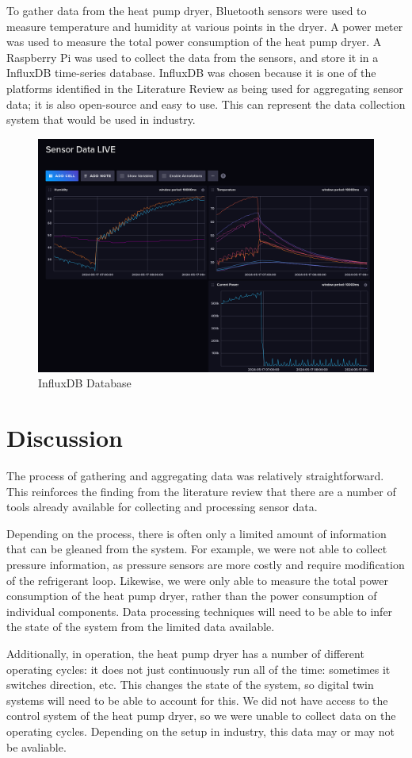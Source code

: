 To gather data from the heat pump dryer, Bluetooth sensors were used to measure temperature and humidity at various points in the dryer. 
A power meter was used to measure the total power consumption of the heat pump dryer. 
A Raspberry Pi was used to collect the data from the sensors, and store it in a InfluxDB time-series database. 
InfluxDB was chosen because it is one of the platforms identified in the Literature Review as being used for aggregating sensor data; it is also open-source and easy to use. 
This can represent the data collection system that would be used in industry.


\begin{figure}
    \centering
    \includegraphics[width=\textwidth]{influxdb.png}
    \caption{InfluxDB Database}
    \label{fig:influxdb}
\end{figure}

\section{Discussion}

The process of gathering and aggregating data was relatively straightforward. 
This reinforces the finding from the literature review that there are a number of tools already available for collecting and processing sensor data. 

Depending on the process, there is often only a limited amount of information that can be gleaned from the system. 
For example, we were not able to collect pressure information, as pressure sensors are more costly and require modification of the refrigerant loop. 
Likewise, we were only able to measure the total power consumption of the heat pump dryer, rather than the power consumption of individual components. 
Data processing techniques will need to be able to infer the state of the system from the limited data available.

Additionally, in operation, the heat pump dryer has a number of different operating cycles: it does not just continuously run all of the time: sometimes it switches direction, etc. 
This changes the state of the system, so digital twin systems will need to be able to account for this. 
We did not have access to the control system of the heat pump dryer, so we were unable to collect data on the operating cycles. 
Depending on the setup in industry, this data may or may not be avaliable.
